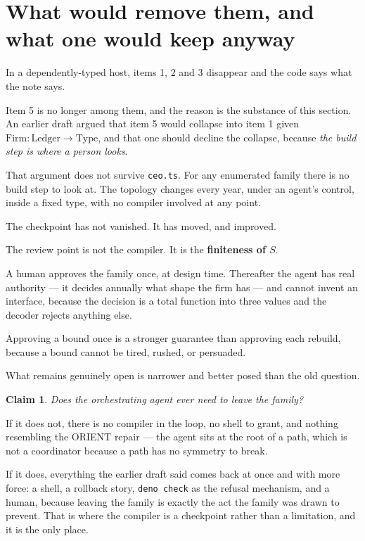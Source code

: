 \documentclass[11pt,a4paper]{article}
\newtheorem*{claim}{Claim}
\begin{document}
\section{What would remove them, and what one would keep anyway}

In a dependently-typed host, items 1, 2 and 3 disappear and the code says what
the note says.

Item 5 is no longer among them, and the reason is the substance of this section.
An earlier draft argued that item 5 would collapse into item 1 given
$\mathrm{Firm} : \mathrm{Ledger} \to \mathrm{Type}$, and that one should
decline the collapse, because \emph{the build step is where a person looks}.

That argument does not survive \texttt{ceo.ts}. For any enumerated family there
is no build step to look at. The topology changes every year, under an agent's
control, inside a fixed type, with no compiler involved at any point.

The checkpoint has not vanished. It has moved, and improved.

\begin{sectionbox}
The review point is not the compiler. It is the \textbf{finiteness of $S$}.

A human approves the family once, at design time. Thereafter the agent has real
authority --- it decides annually what shape the firm has --- and cannot invent
an interface, because the decision is a total function into three values and the
decoder rejects anything else.

Approving a bound once is a stronger guarantee than approving each rebuild,
because a bound cannot be tired, rushed, or persuaded.
\end{sectionbox}

What remains genuinely open is narrower and better posed than the old question.

\begin{claim}
Does the orchestrating agent ever need to leave the family?
\end{claim}

If it does not, there is no compiler in the loop, no shell to grant, and nothing
resembling the ORIENT repair --- the agent sits at the root of a path, which is
not a coordinator because a path has no symmetry to break.

If it does, everything the earlier draft said comes back at once and with more
force: a shell, a rollback story, \texttt{deno check} as the refusal mechanism,
and a human, because leaving the family is exactly the act the family was drawn
to prevent. That is where the compiler is a checkpoint rather than a limitation,
and it is the only place.
\end{document}
